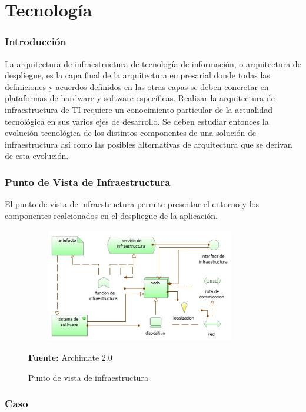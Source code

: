\section{Tecnología}
\subsubsection{Introducción}

La arquitectura de infraestructura de tecnología de información, o arquitectura de despliegue, es la capa final de la arquitectura empresarial donde todas las definiciones y acuerdos definidos en las otras capas se deben concretar en plataformas de hardware y software específicas. Realizar la arquitectura de infraestructura de TI requiere un conocimiento particular de la actualidad tecnológica en sus varios ejes de desarrollo. Se deben estudiar entonces la evolución tecnológica de los distintos componentes de una solución de infraestructura así como las posibles alternativas de arquitectura que se derivan de esta evolución.

\newpage

\subsubsection{Punto de Vista de Infraestructura}

El punto de vista de infraestructura permite presentar el entorno y los componentes realcionados en el despliegue de la aplicación.


\begin{figure}[th!]
	\centering
	\includegraphics[width=10cm,height=5cm]{arquitectura/tecnologia/imgs/infraestructura-e}
	\caption{Punto de vista de infraestructura}{\scriptsize \textbf{Fuente:} Archimate 2.0 \cite{WEB7}}
\end{figure}

\subsubsection{Caso}

